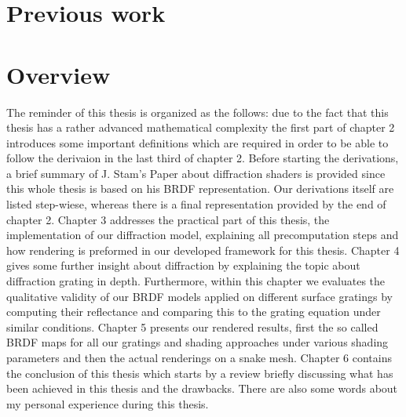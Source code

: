 \section{Previous work}
% 
% 
% 
% 
% 


\section{Overview}
The reminder of this thesis is organized as the follows: due to the fact that this thesis has a rather advanced mathematical complexity the first part of chapter 2 introduces some important definitions which are required in order to be able to follow the derivaion in the last third of chapter 2. Before starting the derivations, a brief summary of J. Stam's Paper about diffraction shaders is provided since this whole thesis is based on his BRDF representation. Our derivations itself are listed step-wiese, whereas there is a final representation provided by the end of chapter 2. Chapter 3 addresses the practical part of this thesis, the implementation of our diffraction model, explaining all precomputation steps and how rendering is preformed in our developed framework for this thesis. Chapter 4  gives some further insight about diffraction by explaining the topic about diffraction grating in depth. Furthermore, within this chapter we evaluates the qualitative validity of our BRDF models applied on different surface gratings by computing their reflectance and comparing this to the grating equation under similar conditions. Chapter 5 presents our rendered results, first the so called BRDF maps for all our gratings and shading approaches under various shading parameters and then the actual renderings on a snake mesh. Chapter 6 contains the conclusion of this thesis which starts by a review briefly discussing what has been achieved in this thesis and the drawbacks. There are also some words about my personal experience during this thesis.
